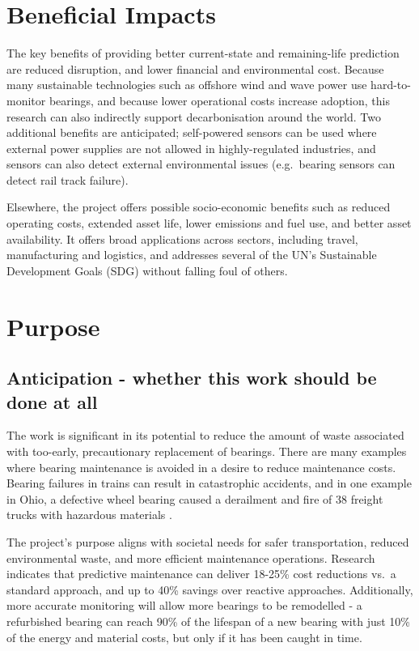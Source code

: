 \documentclass[runningheads]{llncs}
\begin{document}
\section{Beneficial Impacts}
    The key benefits of providing better current-state and remaining-life prediction are reduced disruption, and lower financial and environmental cost. Because many sustainable technologies such as offshore wind and wave power use hard-to-monitor bearings, and because lower operational costs increase adoption, this research can also indirectly support decarbonisation around the world. Two additional benefits are anticipated; self-powered sensors can be used where external power supplies are not allowed in highly-regulated industries, and sensors can also detect external environmental issues (e.g.\ bearing sensors can detect rail track failure).
    
    Elsewhere, the project offers possible socio-economic benefits such as reduced operating costs, extended asset life, lower emissions and fuel use, and better asset availability. It offers broad applications across sectors, including travel, manufacturing and logistics, and addresses several of the UN's Sustainable Development Goals (SDG) without falling foul of others.
\section{Purpose}
\subsection{Anticipation - whether this work should be done at all}
    The work is significant in its potential to reduce the amount of waste associated with too-early, precautionary replacement of bearings. There are many examples where bearing maintenance is avoided in a desire to reduce maintenance costs. Bearing failures in trains can result in catastrophic accidents, and in one example in Ohio, a defective wheel bearing caused a derailment and fire of 38 freight trucks with hazardous materials \cite{wikipedia_2023}.  
    
    The project's purpose aligns with societal needs for safer transportation, reduced environmental waste, and more efficient maintenance operations. Research indicates that predictive maintenance can deliver 18-25\% cost reductions vs.\ a standard approach, and up to 40\% savings over reactive approaches\cite{content_2025}. Additionally, more accurate monitoring will allow more bearings to be remodelled - a refurbished bearing can reach 90\% of the lifespan of a new bearing with just 10\% of the energy and material costs, but only if it has been caught in time\cite{peverill_2021}.
    
\end{document}
